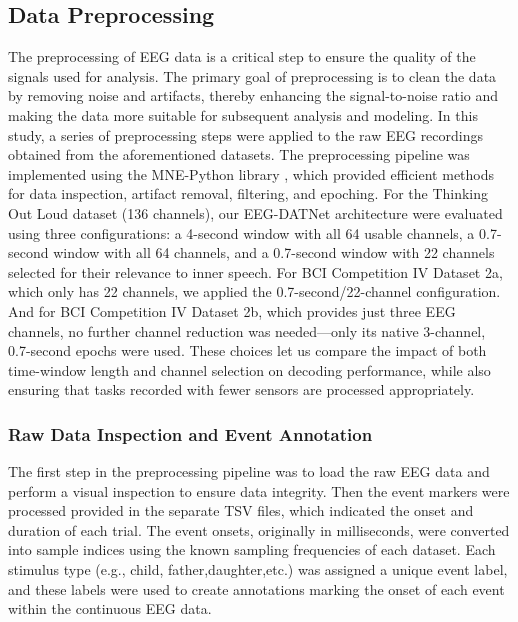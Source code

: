 \documentclass[pdflatex,sn-mathphys-num]{sn-jnl}
\theoremstyle{thmstyleone}%
\theoremstyle{thmstyletwo}%
\theoremstyle{thmstylethree}%
\begin{document}
\subsection{Data Preprocessing}
The preprocessing of EEG data is a critical step to ensure the quality of the signals used
for analysis. The primary goal of preprocessing is to clean the data by removing noise
and artifacts, thereby enhancing the signal-to-noise ratio and making the data more
suitable for subsequent analysis and modeling. In this study, a series of preprocessing steps were applied to the raw EEG recordings obtained from the aforementioned
datasets. The preprocessing pipeline was implemented using the MNE-Python library
\cite{gramfort2013meg}, which provided efficient methods for data inspection, artifact removal, filtering,
and epoching.
For the Thinking Out Loud dataset (136 channels), our EEG-DATNet architecture were evaluated using three configurations: a 4-second window with all 64 usable
channels, a 0.7-second window with all 64 channels, and a 0.7-second window with 22
channels selected for their relevance to inner speech. For BCI Competition IV Dataset
2a, which only has 22 channels, we applied the 0.7-second/22-channel configuration.
And for BCI Competition IV Dataset 2b, which provides just three EEG channels, no
further channel reduction was needed—only its native 3-channel, 0.7-second epochs
were used. These choices let us compare the impact of both time-window length and
channel selection on decoding performance, while also ensuring that tasks recorded
with fewer sensors are processed appropriately.

\subsubsection{Raw Data Inspection and Event Annotation}
The first step in the preprocessing pipeline was to load the raw EEG data and perform
a visual inspection to ensure data integrity. Then the event markers were processed
provided in the separate TSV files, which indicated the onset and duration of each trial.
The event onsets, originally in milliseconds, were converted into sample indices using
the known sampling frequencies of each dataset. Each stimulus type (e.g., \textquotesingle child,\textquotesingle
\textquotesingle father,\textquotesingle \textquotesingle daughter,\textquotesingle etc.) was assigned a unique event label, and these labels were
used to create annotations marking the onset of each event within the continuous EEG
data.
\end{document}
